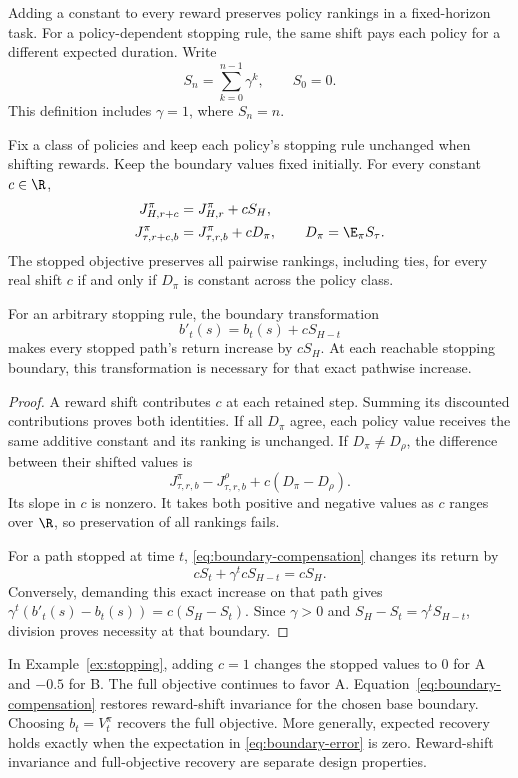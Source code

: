 Adding a constant to every reward preserves policy rankings in a fixed-horizon task. For a policy-dependent stopping rule, the same shift pays each policy for a different expected duration. Write
\[
S_n=\sum_{k=0}^{n-1}\gamma^k,\qquad S_0=0.
\]
This definition includes $\gamma=1$, where $S_n=n$.

\begin{theorem}
\label{thm:reward-shift}
Fix a class of policies and keep each policy's stopping rule unchanged when shifting rewards. Keep the boundary values fixed initially. For every constant $c\in\R$,
\begin{align}
J_{H,r+c}^\pi&=J_{H,r}^\pi+cS_H,\\
J_{\tau,r+c,b}^\pi&=J_{\tau,r,b}^\pi+cD_\pi,
\qquad D_\pi=\E_\pi S_\tau.
\label{eq:shift-stopped}
\end{align}
The stopped objective preserves all pairwise rankings, including ties, for every real shift $c$ if and only if $D_\pi$ is constant across the policy class.

For an arbitrary stopping rule, the boundary transformation
\begin{equation}
b'_t(s)=b_t(s)+cS_{H-t}
\label{eq:boundary-compensation}
\end{equation}
makes every stopped path's return increase by $cS_H$. At each reachable stopping boundary, this transformation is necessary for that exact pathwise increase.
\end{theorem}

\begin{proof}
A reward shift contributes $c$ at each retained step. Summing its discounted contributions proves both identities. If all $D_\pi$ agree, each policy value receives the same additive constant and its ranking is unchanged. If $D_\pi\ne D_\rho$, the difference between their shifted values is
\[
J_{\tau,r,b}^\pi-J_{\tau,r,b}^\rho+c(D_\pi-D_\rho).
\]
Its slope in $c$ is nonzero. It takes both positive and negative values as $c$ ranges over $\R$, so preservation of all rankings fails.

For a path stopped at time $t$, \eqref{eq:boundary-compensation} changes its return by
\[
cS_t+\gamma^t cS_{H-t}=cS_H.
\]
Conversely, demanding this exact increase on that path gives $\gamma^t(b'_t(s)-b_t(s))=c(S_H-S_t)$. Since $\gamma>0$ and $S_H-S_t=\gamma^tS_{H-t}$, division proves necessity at that boundary.
\end{proof}

In Example~\ref{ex:stopping}, adding $c=1$ changes the stopped values to $0$ for A and $-0.5$ for B. The full objective continues to favor A. Equation~\eqref{eq:boundary-compensation} restores reward-shift invariance for the chosen base boundary. Choosing $b_t=V_t^\pi$ recovers the full objective. More generally, expected recovery holds exactly when the expectation in \eqref{eq:boundary-error} is zero. Reward-shift invariance and full-objective recovery are separate design properties.

